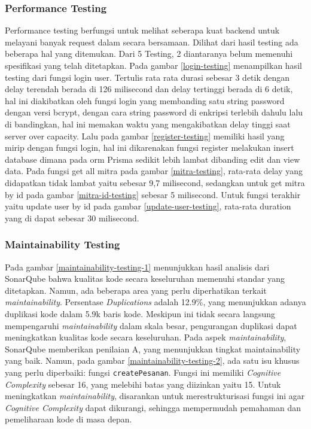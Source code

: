 \subsubsection{Performance Testing}
Performance testing berfungsi untuk melihat seberapa kuat backend untuk melayani banyak request dalam secara bersamaan. Dilihat dari hasil testing ada beberapa hal yang ditemukan. Dari 5 Testing, 2 diantaranya belum memenuhi spesifikasi yang telah ditetapkan. Pada gambar \ref{login-testing} menampilkan hasil testing dari fungsi login user. Tertulis rata rata durasi sebesar 3 detik dengan delay terendah berada di 126 milisecond dan delay tertinggi berada di 6 detik, hal ini diakibatkan oleh fungsi login yang membanding satu string password dengan versi bcrypt, dengan cara string password di enkripsi terlebih dahulu lalu di bandingkan, hal ini memakan waktu yang mengakibatkan delay tinggi saat server over capacity. Lalu pada gambar \ref{register-testing} memiliki hasil yang mirip dengan fungsi login, hal ini dikarenakan fungsi register melakukan insert database dimana pada orm Prisma sedikit lebih lambat dibanding edit dan view data. Pada fungsi get all mitra pada gambar \ref{mitra-testing}, rata-rata delay yang didapatkan tidak lambat yaitu sebesar 9,7 milisecond, sedangkan untuk get mitra by id pada gambar \ref{mitra-id-testing} sebesar 5 milisecond. Untuk fungsi terakhir yaitu update user by id pada gambar \ref{update-user-testing}, rata-rata duration yang di dapat sebesar 30 milisecond.

\subsubsection{Maintainability Testing}
Pada gambar \ref{maintainability-testing-1} menunjukkan hasil analisis dari SonarQube bahwa kualitas kode secara keseluruhan memenuhi standar yang ditetapkan. Namun, ada beberapa area yang perlu diperhatikan terkait \textit{maintainability}. Persentase \textit{Duplications} adalah 12.9\%, yang menunjukkan adanya duplikasi kode dalam 5.9k baris kode. Meskipun ini tidak secara langsung mempengaruhi \textit{maintainability} dalam skala besar, pengurangan duplikasi dapat meningkatkan kualitas kode secara keseluruhan. Pada aspek \textit{maintainability}, SonarQube memberikan penilaian A, yang menunjukkan tingkat maintainability yang baik. Namun, pada gambar \ref{maintainability-testing-2}, ada satu isu khusus yang perlu diperbaiki: fungsi \texttt{createPesanan}. Fungsi ini memiliki \textit{Cognitive Complexity} sebesar 16, yang melebihi batas yang diizinkan yaitu 15. Untuk meningkatkan \textit{maintainability}, disarankan untuk merestrukturisasi fungsi ini agar \textit{Cognitive Complexity} dapat dikurangi, sehingga mempermudah pemahaman dan pemeliharaan kode di masa depan.
